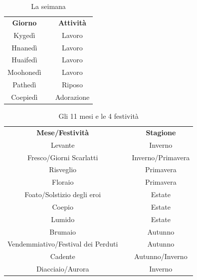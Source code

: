\documentclass[10pt, a4paper]{report}
\begin{document}
	\vspace{1cm}
	\begin{table}[h]
		\centering
		\begin{tabular}{||ccc||}
			\textbf{Giorno} & & \textbf{Attività}\\
			Kygedì & & Lavoro\\
			Hnanedì & & Lavoro\\
			Huaifedì & & Lavoro\\
			Moohonedì & & Lavoro\\
			Pathedì & & Riposo\\
			Coepiedì & & Adorazione\\
		\end{tabular}
		\caption{La seimana}
	\end{table}
\vspace{1cm}
	\begin{table}[h]
		\centering
		\begin{tabular}{||ccc||}
			\textbf{Mese/Festività}  & & \textbf{Stagione} \\
			Levante & & Inverno\\
			Fresco/Giorni Scarlatti & & Inverno/Primavera\\
			Risveglio & & Primavera\\
			Floraio & & Primavera\\
			Foato/Solstizio degli eroi & & Estate\\
			Coepio & & Estate\\
			Lumido & & Estate\\
			Brumaio & & Autunno\\
			Vendemmiativo/Festival dei Perduti & & Autunno\\
			Cadente & & Autunno/Inverno\\ 
			Diacciaio/Aurora & & Inverno\\
		\end{tabular}
		\caption{Gli 11 mesi e le 4 festività}
	\end{table}
	\newpage
\end{document}
